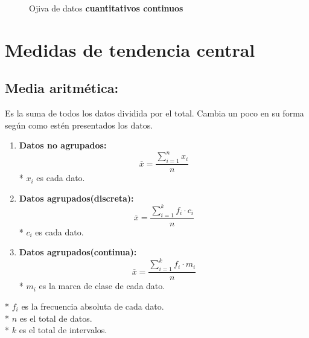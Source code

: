\documentclass{templateNote}
\begin{document}
\begin{figure}[H]
    \centering
    \caption{Ojiva de datos \textbf{cuantitativos continuos}}
\end{figure}

\newpage
\section{Medidas de tendencia central}
\subsection{Media aritmética:}
Es la suma de todos los datos dividida por el total. Cambia un poco en su forma según como
estén presentados los datos.
\begin{enumerate}
    \item \textbf{Datos no agrupados:}
    \begin{equation*}
        \overline{x} = \frac{\displaystyle \sum_{i=1}^{n} x_i}{n}
    \end{equation*}
    * $x_i$ es cada dato.
    \item \textbf{Datos agrupados(discreta):}
    \begin{equation*}
        \overline{x} = \frac{\displaystyle \sum_{i=1}^{k} f_i \cdot c_i}{n}
    \end{equation*}
    * $c_i$ es cada dato.
    \item \textbf{Datos agrupados(continua):}
    \begin{equation*}
        \overline{x} = \frac{\displaystyle \sum_{i=1}^{k} f_i \cdot m_i}{n}
    \end{equation*}
    * $m_i$ es la marca de clase de cada dato.
\end{enumerate}
* $f_i$ es la frecuencia absoluta de cada dato.\\
* $n$ es el total de datos.\\
* $k$ es el total de intervalos.
\end{document}
